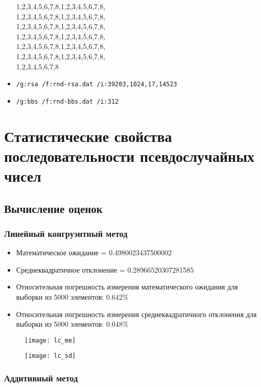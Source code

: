 \documentclass[spec, och, labwork]{SCWorks}
\begin{document}
\begin{itemize}
{    1,2,3,4,5,6,7,8,1,2,3,4,5,6,7,8,\\
    1,2,3,4,5,6,7,8,1,2,3,4,5,6,7,8,\\
    1,2,3,4,5,6,7,8,1,2,3,4,5,6,7,8,\\
    1,2,3,4,5,6,7,8,1,2,3,4,5,6,7,8,\\
    1,2,3,4,5,6,7,8,1,2,3,4,5,6,7,8,\\
    1,2,3,4,5,6,7,8,1,2,3,4,5,6,7,8,\\
    1,2,3,4,5,6,7,8}
  \item \texttt{/g:rsa  /f:rnd-rsa.dat  /i:39203,1024,17,14523}
  \item \texttt{/g:bbs  /f:rnd-bbs.dat  /i:312}
\end{itemize}


\section{Статистические свойства последовательности псевдослучайных чисел}

\subsection{Вычисление оценок}

\subsubsection{Линейный конгруэнтный метод}

\begin{itemize}
  \item Математическое ожидание = 0.4980023437500002
  \item Среднеквадратичное отклонение = 0.28966520307281585
  \item Относительная погрешность измерения математического ожидания для выборки из 5000 элементов: 0.642\%
  \item Относительная погрешность измерения среднеквадратичного отклонения для выборки из 5000 элементов: 0.048\%
\end{itemize}

\begin{figure}[H]
  \centering
  \texttt{[image: lc\_me]}
\end{figure}
\begin{figure}[H]
  \centering
  \texttt{[image: lc\_sd]}
\end{figure}

\subsubsection{Аддитивный метод}
\end{document}
